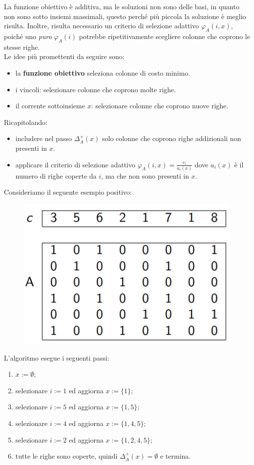 \documentclass{article}
\begin{document}
    La funzione obiettivo è additiva, ma le soluzioni non sono delle basi, in quanto non sono sotto insiemi massimali,
    questo perché più piccola la soluzione è meglio risulta. Inoltre, risulta necessario un criterio di selezione
    adattivo $\varphi_A(i,x)$, poiché uno \textit{puro} $\varphi_A(i)$ potrebbe ripetitivamente scegliere colonne che
    coprono le stesse righe.\\Le idee più promettenti da seguire sono:
    \begin{itemize}
        \item la \textbf{funzione obiettivo} seleziona colonne di costo minimo.
        \item i vincoli: selezionare colonne che coprono molte righe.
        \item il corrente sottoinsieme $x$: selezionare colonne che coprono nuove righe.
    \end{itemize}
    Ricapitolando:
    \begin{itemize}
        \item includere nel passo $\Delta_A^+(x)$ solo colonne che coprono righe addizionali non presenti in $x$.
        \item applicare il criterio di selezione adattivo $\varphi_A(i,x)=\frac{c_i}{a_i(x)}$ dove
              $a_i(x)$ è il numero di righe coperte da $i$, ma che non sono presenti in $x$.
    \end{itemize}
    Consideriamo il seguente esempio positivo:
    \begin{figure}[H]
        \centering
        \includegraphics[scale=0.5]{images/set_cover.png}
    \end{figure}
    L'algoritmo esegue i seguenti passi:
    \begin{enumerate}
        \item $x:=\emptyset;$
        \item selezionare $i:=1$ ed aggiorna $x:=\{1\};$
        \item selezionare $i:=5$ ed aggiorna $x:=\{1,5\};$
        \item selezionare $i:=4$ ed aggiorna $x:=\{1,4,5\};$
        \item selezionare $i:=2$ ed aggiorna $x:=\{1,2,4,5\};$
        \item tutte le righe sono coperte, quindi $\Delta_A^+(x)=\emptyset$ e termina.
    \end{enumerate}
\end{document}
